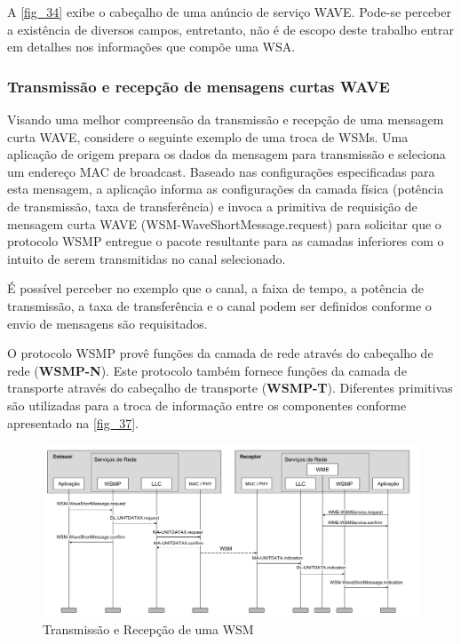 \documentclass[
12pt,				%
openright,			%
oneside,			%
a4paper,			%
brazil,				%
]{abntex2}
\begin{document}
	\par A \autoref{fig_34} exibe o cabeçalho de uma anúncio de serviço WAVE. Pode-se perceber a existência de diversos campos, entretanto, não é de escopo deste trabalho entrar em detalhes nos informações que compõe uma WSA.
	
	\subsubsection{Transmissão e recepção de mensagens curtas WAVE}
	\label{subsubsec:TransRecWSM}

	\par Visando uma melhor compreensão da transmissão e recepção de uma mensagem curta WAVE, considere o seguinte exemplo de uma troca de WSMs. Uma aplicação de origem prepara os dados da mensagem para transmissão e seleciona um endereço MAC de broadcast. Baseado nas configurações especificadas para esta mensagem, a aplicação informa as configurações da camada física (potência de transmissão, taxa de transferência) e invoca a primitiva de requisição de mensagem curta WAVE (WSM-WaveShortMessage.request) para solicitar que o protocolo WSMP entregue o pacote resultante para as camadas inferiores com o intuito de serem transmitidas no canal selecionado.

	\par É possível perceber no exemplo que o canal, a faixa de tempo, a potência de transmissão, a taxa de transferência e o canal podem ser definidos conforme o envio de mensagens são requisitados.	
	
	\par O protocolo WSMP provê funções da camada de rede através do cabeçalho de rede (\textbf{WSMP-N}). Este protocolo também fornece funções da camada de transporte através do cabeçalho de transporte (\textbf{WSMP-T}). Diferentes primitivas são utilizadas para a troca de informação entre os componentes conforme apresentado na \autoref{fig_37}.
	
	\begin{figure} [H]
		\includegraphics[scale=.4]{figuras/cap3/37TransmissaoRecepcaoWSM}
		\caption{\label{fig_37}Transmissão e Recepção de uma WSM}
	\end{figure}
\end{document}
